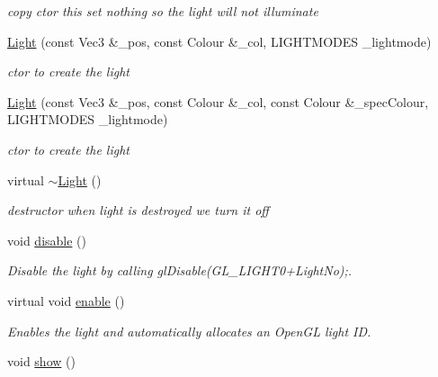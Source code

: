 \begin{DoxyCompactItemize}
\begin{DoxyCompactList}\small\item\em copy ctor this set nothing so the light will not illuminate \end{DoxyCompactList}\item 
\hyperlink{classngl_1_1_light_a1a39ba791902f538c44c8f78f92083f5}{Light} (const Vec3 \&\-\_\-pos, const Colour \&\-\_\-col, L\-I\-G\-H\-T\-M\-O\-D\-E\-S \-\_\-lightmode)
\begin{DoxyCompactList}\small\item\em ctor to create the light \end{DoxyCompactList}\item 
\hyperlink{classngl_1_1_light_a64a48426b9821ef040efb0928fd27414}{Light} (const Vec3 \&\-\_\-pos, const Colour \&\-\_\-col, const Colour \&\-\_\-spec\-Colour, L\-I\-G\-H\-T\-M\-O\-D\-E\-S \-\_\-lightmode)
\begin{DoxyCompactList}\small\item\em ctor to create the light \end{DoxyCompactList}\item 
\hypertarget{classngl_1_1_light_a3a304983c33a2ed286299e34d8089d02}{virtual \hyperlink{classngl_1_1_light_a3a304983c33a2ed286299e34d8089d02}{$\sim$\-Light} ()}\label{classngl_1_1_light_a3a304983c33a2ed286299e34d8089d02}

\begin{DoxyCompactList}\small\item\em destructor when light is destroyed we turn it off \end{DoxyCompactList}\item 
\hypertarget{classngl_1_1_light_ad8a265e7c2076ad1c7d24fefd4201df0}{void \hyperlink{classngl_1_1_light_ad8a265e7c2076ad1c7d24fefd4201df0}{disable} ()}\label{classngl_1_1_light_ad8a265e7c2076ad1c7d24fefd4201df0}

\begin{DoxyCompactList}\small\item\em Disable the light by calling gl\-Disable(G\-L\-\_\-\-L\-I\-G\-H\-T0+\-Light\-No);. \end{DoxyCompactList}\item 
virtual void \hyperlink{classngl_1_1_light_a1fa84fda6ad283674a351aa0fdc7d12a}{enable} ()
\begin{DoxyCompactList}\small\item\em Enables the light and automatically allocates an Open\-G\-L light I\-D. \end{DoxyCompactList}\item 
\hypertarget{classngl_1_1_light_a328389a585ba1efcf6eb08fd5b7b0181}{void \hyperlink{classngl_1_1_light_a328389a585ba1efcf6eb08fd5b7b0181}{show} ()}\label{classngl_1_1_light_a328389a585ba1efcf6eb08fd5b7b0181}


\end{DoxyCompactItemize}
